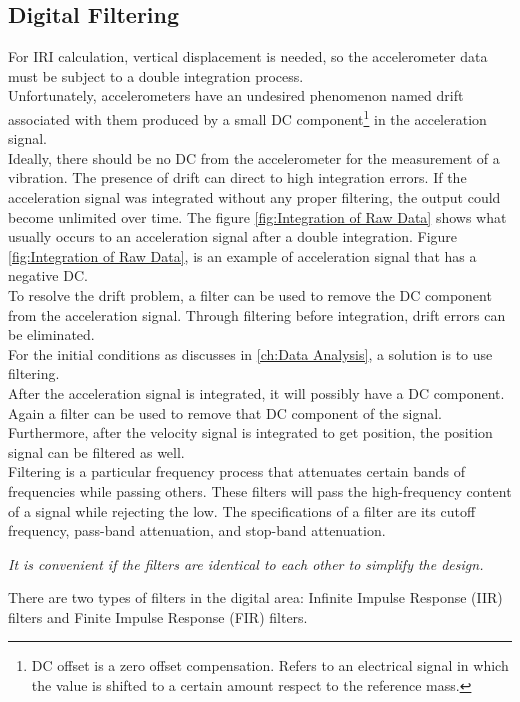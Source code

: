 \documentclass[tesi]{subfiles}
\begin{document}
\subsection{Digital Filtering} \label{ssc:Digital Filtering}
For IRI calculation, vertical displacement is needed, so the accelerometer data must be subject to a double integration process.\\
Unfortunately, accelerometers have an undesired phenomenon named drift associated with them produced by a small DC component\footnote{DC offset is a zero offset compensation. Refers to an electrical signal in which the value is shifted to a certain amount respect to the reference mass.} in the acceleration signal.\\
Ideally, there should be no DC from the accelerometer for the measurement of a vibration. The presence of drift can direct to high integration errors. If the acceleration signal was integrated without any proper filtering, the output could become unlimited over time. The figure \ref{fig:Integration of Raw Data} shows what usually occurs to an acceleration signal after a double integration. Figure \ref{fig:Integration of Raw Data}, is an example of acceleration signal that has a negative DC.\\To resolve the drift problem, a filter can be used to remove the DC component from the acceleration signal. Through filtering before integration, drift errors can be eliminated.\\
For the initial conditions as discusses in \ref{ch:Data Analysis}, a solution is to use filtering.\\  
After the acceleration signal is integrated, it will possibly have a DC component. Again a filter can be used to remove that DC component of the signal. Furthermore, after the velocity signal is integrated to get position, the position signal can be filtered as well.	\\
Filtering is a particular frequency process that attenuates certain bands of frequencies while passing others. These filters will pass the high-frequency content of a signal while rejecting the low. The specifications of a filter are its cutoff frequency, pass-band attenuation, and stop-band attenuation. 
\begin{center}\textit{It is convenient if the filters are identical to each other to simplify the design.}\end{center}


There are two types of filters in the digital area: Infinite Impulse Response (IIR) filters and Finite Impulse Response (FIR) filters. 
\end{document}
